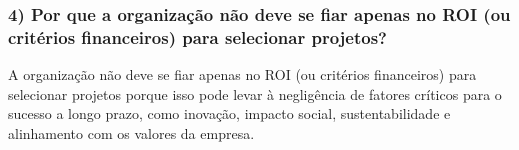\documentclass{article}
\begin{document}
	\subsubsection*{4) Por que a organização não deve se fiar apenas no ROI (ou critérios financeiros) para selecionar projetos?}
	
	
	A organização não deve se fiar apenas no ROI (ou critérios financeiros) para selecionar projetos porque isso pode levar à negligência de fatores críticos para o sucesso a longo prazo, como inovação, impacto social, sustentabilidade e alinhamento com os valores da empresa.
	
	
\end{document}
